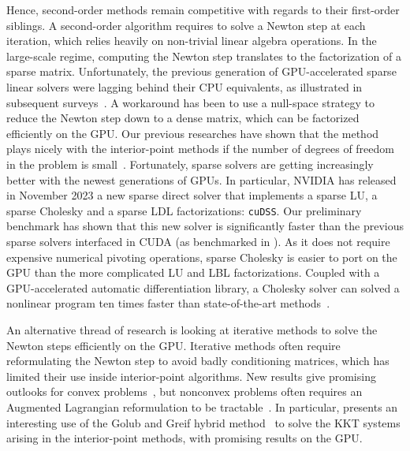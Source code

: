 Hence, second-order methods remain competitive with regards to their first-order
siblings. A second-order algorithm requires to solve a Newton step at each
iteration, which relies heavily on non-trivial linear algebra operations.
In the large-scale regime, computing the Newton step translates to the
factorization of a sparse matrix.
Unfortunately, the previous generation of GPU-accelerated sparse linear
solvers were lagging behind their CPU equivalents, as illustrated in
subsequent surveys~\cite{tasseff2019exploring,swirydowicz2021linear}.
A workaround has been to use a null-space strategy to reduce the Newton
step down to a dense matrix, which can be factorized efficiently on the GPU.
Our previous researches have shown that the method plays nicely with the interior-point
methods if the number of degrees of freedom in the problem is small~\cite{pacaud2022condensed}.
Fortunately, sparse solvers are getting increasingly better with the newest
generations of GPUs. In particular, NVIDIA has released in November 2023
a new sparse direct solver that implements a sparse LU, a sparse Cholesky
and a sparse LDL factorizations: {\tt cuDSS}. Our
preliminary benchmark has shown that this new solver is significantly
faster than the previous sparse solvers interfaced in CUDA (as benchmarked in \cite{swirydowicz2021linear}).
As it does not require expensive numerical pivoting operations, sparse Cholesky
is easier to port on the GPU than the more complicated LU and LBL factorizations.
Coupled with a GPU-accelerated automatic differentiation library, a Cholesky
solver can solved a nonlinear program ten times faster than state-of-the-art
methods~\cite{shin2023accelerating}.

An alternative thread of research is looking at iterative methods to solve the Newton steps efficiently on the GPU.
Iterative methods often require reformulating the Newton step to avoid
badly conditioning matrices, which has limited their use inside interior-point
algorithms. New results give promising outlooks for convex problems~\cite{ghannad2022linear},
but nonconvex problems often requires an Augmented Lagrangian reformulation
to be tractable~\cite{cao2016augmented,regev2023hykkt}. In particular,
\cite{regev2023hykkt} presents an interesting use of the Golub and Greif
hybrid method~\cite{golub2003solving} to solve the KKT systems arising in
the interior-point methods, with promising results on the GPU.

